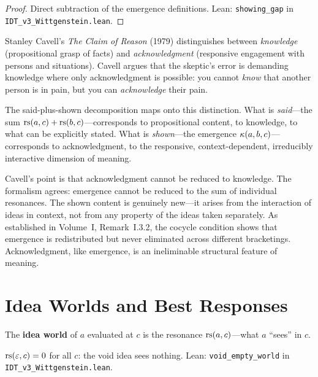 \begin{proof}
Direct subtraction of the emergence definitions.
Lean: \texttt{showing\_gap} in \texttt{IDT\_v3\_Wittgenstein.lean}.
\end{proof}

\begin{interpretation}
Stanley Cavell's \textit{The Claim of Reason} (1979) distinguishes between
\emph{knowledge} (propositional grasp of facts) and \emph{acknowledgment}
(responsive engagement with persons and situations). Cavell argues that the
skeptic's error is demanding knowledge where only acknowledgment is possible:
you cannot \emph{know} that another person is in pain, but you can
\emph{acknowledge} their pain.

The said-plus-shown decomposition maps onto this distinction. What is
\emph{said}---the sum $\mathrm{rs}(a,c) + \mathrm{rs}(b,c)$---corresponds to propositional
content, to knowledge, to what can be explicitly stated. What is
\emph{shown}---the emergence $\kappa(a,b,c)$---corresponds to acknowledgment,
to the responsive, context-dependent, irreducibly interactive dimension of
meaning.

Cavell's point is that acknowledgment cannot be reduced to knowledge. The
formalism agrees: emergence cannot be reduced to the sum of individual resonances.
The shown content is genuinely new---it arises from the interaction of ideas in
context, not from any property of the ideas taken separately. As established in
Volume~I, Remark~I.3.2, the cocycle condition shows that emergence is
redistributed but never eliminated across different bracketings. Acknowledgment,
like emergence, is an ineliminable structural feature of meaning.
\end{interpretation}

\section{Idea Worlds and Best Responses}

\begin{definition}
The \textbf{idea world} of $a$ evaluated at $c$ is the resonance
$\mathrm{rs}(a, c)$---what $a$ ``sees'' in $c$.
\end{definition}

\begin{theorem}
\label{thm:void-empty-world}
$\mathrm{rs}(\varepsilon, c) = 0$ for all $c$: the void idea sees nothing.
Lean: \texttt{void\_empty\_world} in \texttt{IDT\_v3\_Wittgenstein.lean}.
\end{theorem}


